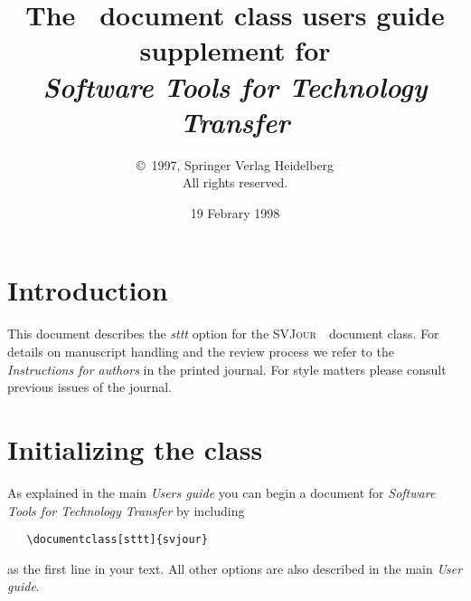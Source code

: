 \documentclass[draft]{ltxguide}[1995/11/28]
\title{The \SJour\ document class users guide\\supplement for\\
\textit{Software Tools for Technology Transfer}}
\author{\copyright~1997, Springer Verlag Heidelberg\\
   All rights reserved.}
\date{19 Febrary 1998}
\newcommand{\SJour}{\textsc{SVJour}}
\begin{document}
\maketitle

\section{Introduction}
\label{sec:intro}
This document describes the \textit{sttt} option for the
\SJour\ \LaTeXe\ document class. For details on
manuscript handling and the review process we refer to the
\emph{Instructions for authors} in the printed journal. For style
matters please consult previous issues of the journal.

\section{Initializing the class}
\label{sec:opt}

As explained in the main \emph{Users guide} you can
begin a document for \emph{Software Tools for Technology Transfer} by including
\begin{verbatim}
   \documentclass[sttt]{svjour}
\end{verbatim}
as the first line in your text. All other options are also described in
the main \emph{User guide}.
\end{document}
